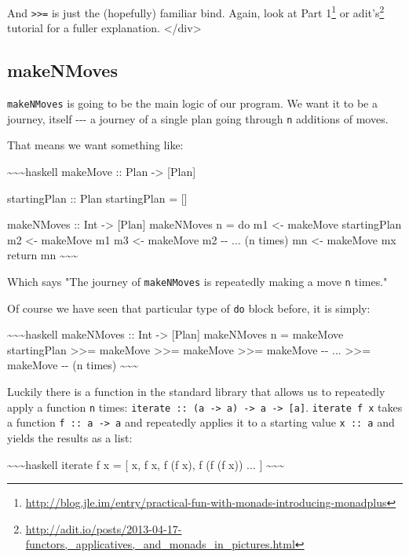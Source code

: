 \documentclass[]{article}
\renewcommand{\href}[2]{#2\footnote{\url{#1}}}
\begin{document}
And \texttt{\textgreater{}\textgreater{}=} is just the (hopefully) familiar
bind. Again, look at
\href{http://blog.jle.im/entry/practical-fun-with-monads-introducing-monadplus}{Part
1} or
\href{http://adit.io/posts/2013-04-17-functors,_applicatives,_and_monads_in_pictures.html}{adit's}
tutorial for a fuller explanation. \textless{}/div\textgreater{}

\subsection{makeNMoves}

\texttt{makeNMoves} is going to be the main logic of our program. We want it to
be a journey, itself -\/-\/- a journey of a single plan going through \texttt{n}
additions of moves.

That means we want something like:

\textasciitilde{}\textasciitilde{}\textasciitilde{}haskell makeMove :: Plan
-\textgreater{} {[}Plan{]}

startingPlan :: Plan startingPlan = {[}{]}

makeNMoves :: Int -\textgreater{} {[}Plan{]} makeNMoves n = do m1 \textless{}-
makeMove startingPlan m2 \textless{}- makeMove m1 m3 \textless{}- makeMove m2
-\/- ... (n times) mn \textless{}- makeMove mx return mn
\textasciitilde{}\textasciitilde{}\textasciitilde{}

Which says "The journey of \texttt{makeNMoves} is repeatedly making a move
\texttt{n} times."

Of course we have seen that particular type of \texttt{do} block before, it is
simply:

\textasciitilde{}\textasciitilde{}\textasciitilde{}haskell makeNMoves :: Int
-\textgreater{} {[}Plan{]} makeNMoves n = makeMove startingPlan
\textgreater{}\textgreater{}= makeMove \textgreater{}\textgreater{}= makeMove
\textgreater{}\textgreater{}= makeMove -\/- ... \textgreater{}\textgreater{}=
makeMove -\/- (n times) \textasciitilde{}\textasciitilde{}\textasciitilde{}

Luckily there is a function in the standard library that allows us to repeatedly
apply a function \texttt{n} times:
\texttt{iterate\ ::\ (a\ -\textgreater{}\ a)\ -\textgreater{}\ a\ -\textgreater{}\ {[}a{]}}.
\texttt{iterate\ f\ x} takes a function \texttt{f\ ::\ a\ -\textgreater{}\ a}
and repeatedly applies it to a starting value \texttt{x\ ::\ a} and yields the
results as a list:

\textasciitilde{}\textasciitilde{}\textasciitilde{}haskell iterate f x = {[} x,
f x, f (f x), f (f (f x)) ... {]}
\textasciitilde{}\textasciitilde{}\textasciitilde{}
\end{document}
